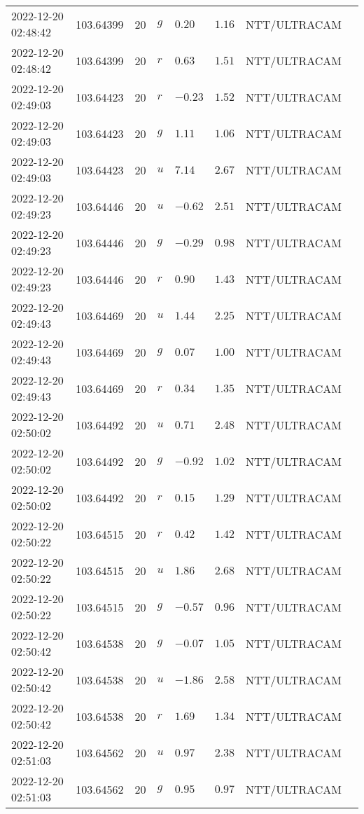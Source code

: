 \documentclass{nature_plusfigure}
\begin{document}
\begin{supplement}
\begin{center}
\begin{longtable}{llllllll}
2022-12-20 02:48:42 & 103.64399 & 20 & $g$ & $0.20$ & $1.16$ & NTT/ULTRACAM &  \\ 
2022-12-20 02:48:42 & 103.64399 & 20 & $r$ & $0.63$ & $1.51$ & NTT/ULTRACAM &  \\ 
2022-12-20 02:49:03 & 103.64423 & 20 & $r$ & $-0.23$ & $1.52$ & NTT/ULTRACAM &  \\ 
2022-12-20 02:49:03 & 103.64423 & 20 & $g$ & $1.11$ & $1.06$ & NTT/ULTRACAM &  \\ 
2022-12-20 02:49:03 & 103.64423 & 20 & $u$ & $7.14$ & $2.67$ & NTT/ULTRACAM &  \\ 
2022-12-20 02:49:23 & 103.64446 & 20 & $u$ & $-0.62$ & $2.51$ & NTT/ULTRACAM &  \\ 
2022-12-20 02:49:23 & 103.64446 & 20 & $g$ & $-0.29$ & $0.98$ & NTT/ULTRACAM &  \\ 
2022-12-20 02:49:23 & 103.64446 & 20 & $r$ & $0.90$ & $1.43$ & NTT/ULTRACAM &  \\ 
2022-12-20 02:49:43 & 103.64469 & 20 & $u$ & $1.44$ & $2.25$ & NTT/ULTRACAM &  \\ 
2022-12-20 02:49:43 & 103.64469 & 20 & $g$ & $0.07$ & $1.00$ & NTT/ULTRACAM &  \\ 
2022-12-20 02:49:43 & 103.64469 & 20 & $r$ & $0.34$ & $1.35$ & NTT/ULTRACAM &  \\ 
2022-12-20 02:50:02 & 103.64492 & 20 & $u$ & $0.71$ & $2.48$ & NTT/ULTRACAM &  \\ 
2022-12-20 02:50:02 & 103.64492 & 20 & $g$ & $-0.92$ & $1.02$ & NTT/ULTRACAM &  \\ 
2022-12-20 02:50:02 & 103.64492 & 20 & $r$ & $0.15$ & $1.29$ & NTT/ULTRACAM &  \\ 
2022-12-20 02:50:22 & 103.64515 & 20 & $r$ & $0.42$ & $1.42$ & NTT/ULTRACAM &  \\ 
2022-12-20 02:50:22 & 103.64515 & 20 & $u$ & $1.86$ & $2.68$ & NTT/ULTRACAM &  \\ 
2022-12-20 02:50:22 & 103.64515 & 20 & $g$ & $-0.57$ & $0.96$ & NTT/ULTRACAM &  \\ 
2022-12-20 02:50:42 & 103.64538 & 20 & $g$ & $-0.07$ & $1.05$ & NTT/ULTRACAM &  \\ 
2022-12-20 02:50:42 & 103.64538 & 20 & $u$ & $-1.86$ & $2.58$ & NTT/ULTRACAM &  \\ 
2022-12-20 02:50:42 & 103.64538 & 20 & $r$ & $1.69$ & $1.34$ & NTT/ULTRACAM &  \\ 
2022-12-20 02:51:03 & 103.64562 & 20 & $u$ & $0.97$ & $2.38$ & NTT/ULTRACAM &  \\ 
2022-12-20 02:51:03 & 103.64562 & 20 & $g$ & $0.95$ & $0.97$ & NTT/ULTRACAM &  \\ 

\end{longtable}
\end{center}
\end{supplement}
\end{document}
